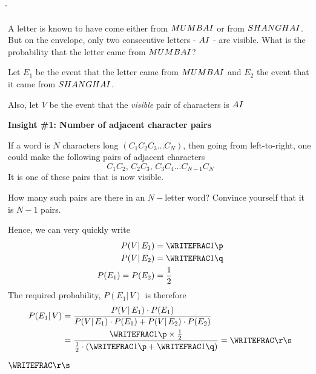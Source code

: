 


\SUBTRACT{}\p
\SUBTRACT{}\q
\FRACADD\vf\p\vg\q\m\n
\FRACDIV\vf\p\m\n\r\s

\question[4] A letter is known to have come either from $MUMBAI$ or from $SHANGHAI$. 
But on the envelope, only two consecutive letters - $AI$ - are visible. 
What is the probability that the letter came from $MUMBAI$? 

\watchout[-40pt]

\begin{solution}[\halfpage]
Let $E_1$ be the event that the letter came from $MUMBAI$ and $E_2$ 
the event that it came from $SHANGHAI$. 

Also, let $V$ be the event that 
the \textit{visible} pair of characters is $AI$

\textbf{Insight \#1: Number of adjacent character pairs}

If a word is $N$ characters long $(C_1C_2C_3\ldots C_N)$, then going from left-to-right, 
one could make the following pairs of adjacent characters 
\[ C_1C_2,\,C_2C_3,\,C_3C_4\ldots C_{N-1}C_N \] 
It is one of these pairs that is now visible. 

How many such pairs are there in an $N-$letter word? Convince yourself that it is $N-1$ pairs.

Hence, we can very quickly write 
\begin{align}
  P(V\vert\,E_1) &= \WRITEFRAC\vf\p \\ 
  P(V\vert\,E_2) &= \WRITEFRAC\vg\q \\ 
  P(E_1) = P(E_2) &= \dfrac{1}{2}
\end{align}
  The required probability, $P(E_1\vert\,V)$ is therefore
  \begin{align}
    P(E_1\vert\,V) &= \dfrac{P(V\vert\,E_1)\cdot P(E_1)}{P(V\vert\,E_1)\cdot P(E_1) + P(V\vert\,E_2)\cdot P(E_2)} \\
    &= \dfrac{\WRITEFRAC\vf\p\times\frac{1}{2}}
        {\frac{1}{2}\cdot\left( \WRITEFRAC\vf\p + \WRITEFRAC\vg\q \right)} = \WRITEFRAC\r\s
  \end{align}
  
\end{solution}

\ifprintanswers\begin{codex}$\WRITEFRAC\r\s$\end{codex}\fi
